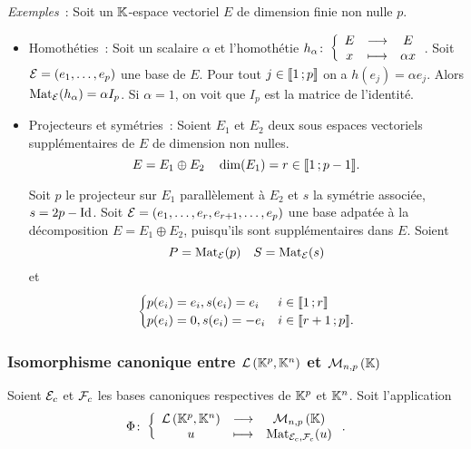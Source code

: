 \emph{Exemples}~: Soit un \(\mathbb{K}\)-espace vectoriel \(E\) de dimension finie non
nulle \(p\).
\begin{itemize}
  \item Homothéties~: Soit un scalaire \(\alpha\) et l'homothétie
    \(h_\alpha\colon\left\{\begin{array}{ccc}E & \longrightarrow &E\\x & \longmapsto & \alpha x\end{array}\right.\). Soit \(\mathcal{E}=(e_1,\ldots, e_p)\)
    une base de \(E\). Pour tout \(j \in \mathopen{\llbracket}1\mathclose{}\mathpunct{};p\mathclose{\rrbracket}\) on a
    \(h(e_j)=\alpha e_j\). Alors \(\mathrm{Mat}_{\mathcal{E}}(h_\alpha)=\alpha I_p\). Si
    \(\alpha=1\), on voit que \(I_p\) est la matrice de l'identité.
  \item Projecteurs et symétries~: Soient \(E_1\) et \(E_2\) deux sous espaces
    vectoriels supplémentaires de \(E\) de dimension non nulles.
    \begin{equation}
      E=E_1 \oplus E_2 \quad \dim(E_1)=r \in \mathopen{\llbracket}1\mathclose{}\mathpunct{};p-1\mathclose{\rrbracket}.
    \end{equation}

    Soit \(p\) le projecteur sur \(E_1\) parallèlement à \(E_2\) et \(s\) la
    symétrie associée, \(s=2p -\operatorname{Id}\). Soit \(\mathcal{E}=(e_1, \ldots, e_r, e_{r+1},
    \ldots, e_p)\) une base adpatée à la décomposition \(E=E_1 \oplus E_2\),
    puisqu'ils sont supplémentaires dans \(E\). Soient
    \begin{equation}
      P=\mathrm{Mat}_{\mathcal{E}}(p) \quad S=\mathrm{Mat}_{\mathcal{E}}(s)
    \end{equation}
    et
    \begin{equation}
      \begin{cases}
        p(e_i)=e_i, s(e_i)=e_i & i \in \mathopen{\llbracket}1\mathclose{}\mathpunct{};r\mathclose{\rrbracket} \\
        p(e_i)=0, s(e_i)=-e_i & i \in \mathopen{\llbracket}r+1\mathclose{}\mathpunct{};p\mathclose{\rrbracket}.
      \end{cases}
    \end{equation}
\end{itemize}

\subsubsection{Isomorphisme canonique entre \(\mathcal{L}\left(\mathbb{K}^p,\mathbb{K}^n\right)\) et
\(\mathcal{M}_{n,p}\left(\mathbb{K}\right)\)}


Soient \(\mathcal{E}_c\) et \(\mathcal{F}_c\) les bases canoniques respectives de \(\mathbb{K}^p\) et
\(\mathbb{K}^n\). Soit l'application
\[\Phi\colon\left\{\begin{array}{ccc}\mathcal{L}\left(\mathbb{K}^p,\mathbb{K}^n\right) & \longrightarrow &\mathcal{M}_{n,p}\left(\mathbb{K}\right)\\u & \longmapsto & \mathrm{Mat}_{\mathcal{E}_c,\mathcal{F}_c}(u)\end{array}\right..\]

